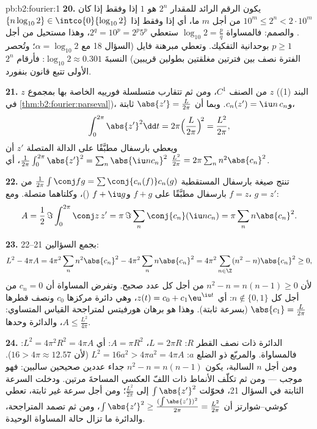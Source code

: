 \begin{solution}{pb:b2:fourier:1}
\textbf{20.} يكون الرقم الرائد للمقدار $2^n$ هو $1$ إذا وفقط إذا كان $10^m \leq 2^n <
2\cdot10^m$ من أجل $m$ ما، أي إذا وفقط إذا $\{n\log_{10}2\} \in
\intco{0}{\log_{10}2}$. والصمم: فالمساواة $\log_{10}2 =
\frac pq$ ستعطي $2^q = 10^p = 2^p5^p$، وهذا مستحيل من أجل $p
\geq 1$ بوحدانية التفكيك. وتعطي مبرهنة فايل (السؤال 18
مع $\alpha = \log_{10}2$؛ وتُحصر الفترة نصف 
بين فترتين مغلقتين بطولين قريبين) النسبةَ
$\log_{10}2 \approx 0.301$: فأرقام $2^n$ الأولى تتبع
قانون بنفورد.

\textbf{21.} $z$ من الصنف $C^1$، ومن ثم تتقارب متسلسلة فورييه الخاصة بها
 بمجموع $z$ (البند (1) في \cref{thm:b2:fourier:parseval})،
و$c_n(z') = \iu n\,c_n$. وبما أن $\abs{z'} = \frac{L}{2\pi}$
ثابتة،
\[
\int_0^{2\pi}\abs{z'}^2\dd t
= 2\pi\Bigl(\frac{L}{2\pi}\Bigr)^{\!2}
= \frac{L^2}{2\pi} ,
\]
ويعطي بارسفال مطبَّقًا على الدالة المتصلة $z'$
أن $\frac{1}{2\pi}\int_0^{2\pi}\abs{z'}^2 =
\sum_n\abs{\iu nc_n}^2$، أي $\frac{L^2}{2\pi} = 2\pi\sum_n
n^2\abs{c_n}^2$.

\textbf{22.} تنتج صيغة بارسفال المستقطبة $\frac{1}{2\pi}\int\conj
fg = \sum\conj{c_n(f)}c_n(g)$ من بارسفال مطبَّقًا على
$f + g$ و$f + \iu g$ ()، وكلتاهما
متصلة. ومع $f = z$، $g = z'$:
\[
A = \frac12\,\Im\int_0^{2\pi}\conj z\,z'
= \pi\,\Im\sum_n\conj{c_n}(\iu n c_n)
= \pi\sum_n n\abs{c_n}^2 .
\]

\textbf{23.} بجمع السؤالين 21--22:
\[
L^2 - 4\pi A
= 4\pi^2\sum_n n^2\abs{c_n}^2 -
4\pi^2\sum_n n\abs{c_n}^2
= 4\pi^2\sum_{n\in\Z}(n^2 - n)\abs{c_n}^2 \geq 0 ,
\]
لأن $n^2 - n = n(n-1) \geq 0$ من أجل كل عدد صحيح. وتفرض المساواة
أن $c_n = 0$ من أجل كل $n \notin \{0, 1\}$: أي $z(t) = c_0 +
c_1\eu^{\iu t}$، وهي دائرة مركزها $c_0$ ونصف قطرها
$\abs{c_1} = \frac{L}{2\pi}$ (بسرعة ثابتة). وهذا هو برهان هورفيتس
لمتراجحة القياس المتساوي: $A \leq \frac{L^2}{4\pi}$،
والدائرة وحدها.

\textbf{24.} الدائرة ذات نصف القطر $R$: $L = 2\pi R$، $A = \pi
R^2$: أي $L^2 = 4\pi^2R^2 = 4\pi A$: فالمساواة. والمربّع ذو الضلع
$a$: $L^2 = 16a^2 > 4\pi a^2 = 4\pi A$ (لأن $16 > 4\pi \approx
12.57$). ومن أجل $n$ السالبة، يكون $n^2 - n = n(n - 1)$ جداء
عددين صحيحين سالبين: فهو موجب --- ومن ثم تكلّف الأنماط
ذات اللفّ العكسي المساحةَ مرتين. ودخلت السرعة الثابتة في السؤال 21،
فحوّلت $\int\abs{z'}^2$ إلى $\frac{L^2}{2\pi}$؛ ومن أجل
سرعة غير ثابتة، تعطي كوشي--شوارتز أن $\int\abs{z'}^2 \geq
\frac{(\int\abs{z'})^2}{2\pi} = \frac{L^2}{2\pi}$، ومن ثم
تصمد المتراجحة، والدائرة ما تزال حالة المساواة الوحيدة.


\end{solution}
